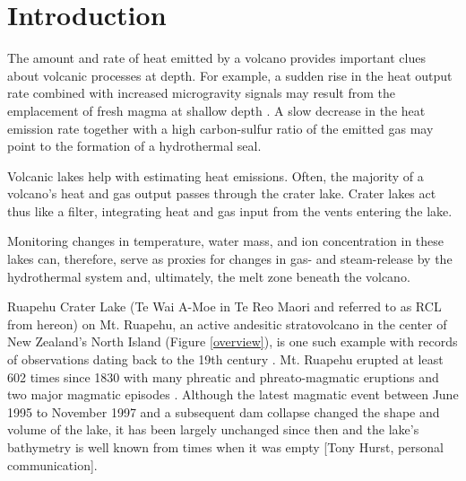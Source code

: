 \documentclass{bmcart}
\begin{document}


\section{Introduction}

The amount and rate of heat emitted by a volcano provides important clues about
volcanic processes at depth. For example, a sudden rise in the heat output rate
combined with increased microgravity signals may result from the emplacement of
fresh magma at shallow depth \cite{Brown1991}. A slow decrease in the heat
emission rate together with a high carbon-sulfur ratio of the emitted gas may
point to the formation of a hydrothermal seal.

Volcanic lakes help with estimating heat emissions. Often, the majority of a
volcano's heat and gas output passes through the crater lake. Crater lakes act thus
like a filter, integrating heat and gas input from the vents entering the lake.

Monitoring changes in temperature, water mass, and ion concentration in these
lakes can, therefore, serve as proxies for changes in gas- and steam-release by
the hydrothermal system and, ultimately, the melt zone beneath the volcano. 

Ruapehu Crater Lake (Te Wai A-Moe in Te Reo Maori and referred to as RCL from
hereon) on Mt. Ruapehu, an active andesitic stratovolcano in the center of New
Zealand's North Island (Figure \ref{overview}), is one such example with records
of observations dating back to the 19th century \cite{Friedlander1898}. Mt.
Ruapehu erupted at least 602 times since 1830 with many phreatic and
phreato-magmatic eruptions and two major magmatic episodes \citep{Scott2013}.
Although the latest magmatic event between June 1995 to November 1997 and a
subsequent dam collapse changed the shape and volume of the lake, it has been
largely unchanged since then and the lake's bathymetry is well known from times
when it was empty [Tony Hurst, personal communication].
\end{document}
